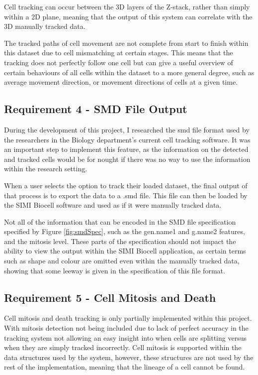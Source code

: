 \documentclass[12pt a4paper]{article}
\begin{document}
Cell tracking can occur between the 3D layers of the Z-stack, rather than simply within a 2D plane, meaning that the output of this system can correlate with the 3D manually tracked data.

The tracked paths of cell movement are not complete from start to finish within this dataset due to cell mismatching at certain stages. This means that the tracking does not perfectly follow one cell but can give a useful overview of certain behaviours of all cells within the dataset to a more general degree, such as average movement direction, or movement directions of cells at a given time.
\subsection{Requirement 4 - SMD File Output}
During the development of this project, I researched the smd file format used by the researchers in the Biology department's current cell tracking software. It was an important step to implement this feature, as the information on the detected and tracked cells would be for nought if there was no way to use the information within the research setting. 

When a user selects the option to track their loaded dataset, the final output of that process is to export the data to a .smd file. This file can then be loaded by the SIMI Biocell software and used as if it were manually tracked data.

Not all of the information that can be encoded in the SMD file specification specified by Figure \ref{fig:smdSpec}, such as the gen.name1 and g.name2 features, and the mitosis level. These parts of the specification should not impact the ability to view the output within the SIMI Biocell application, as certain terms such as shape and colour are omitted even within the manually tracked data, showing that some leeway is given in the specification of this file format.
\subsection{Requirement 5 - Cell Mitosis and Death} 
Cell mitosis and death tracking is only partially implemented within this project. With mitosis detection not being included due to lack of perfect accuracy in the tracking system not allowing an easy insight into when cells are splitting versus when they are simply tracked incorrectly. Cell mitosis is supported within the data structures used by the system, however, these structures are not used by the rest of the implementation, meaning that the lineage of a cell cannot be found.
\end{document}
